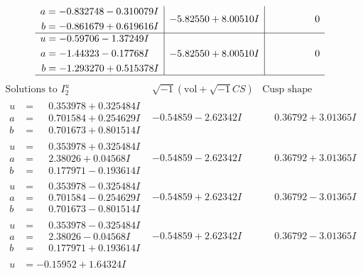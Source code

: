 \documentclass[1p]{elsarticle_modified}
\theoremstyle{definition}
\newcommand{\I}{\sqrt{-1}}
\begin{document}
$$\begin{array}{c|c|c}
\begin{aligned}
a &= -0.832748 - 0.310079 I \\
b &= -0.861679 + 0.619616 I\end{aligned}
 & -5.82550 + 8.00510 I & \phantom{-0.000000 } 0 \\ \hline\begin{aligned}
u &= -0.59706 - 1.37249 I \\
a &= -1.44323 - 0.17768 I \\
b &= -1.293270 + 0.515378 I\end{aligned}
 & -5.82550 + 8.00510 I & \phantom{-0.000000 } 0\\
 \hline 
 \end{array}$$\newpage$$\begin{array}{c|c|c}  
\text{Solutions to }I^u_{2}& \I (\text{vol} + \sqrt{-1}CS) & \text{Cusp shape}\\
 \hline 
\begin{aligned}
u &= \phantom{-}0.353978 + 0.325484 I \\
a &= \phantom{-}0.701584 + 0.254629 I \\
b &= \phantom{-}0.701673 + 0.801514 I\end{aligned}
 & -0.54859 - 2.62342 I & \phantom{-}0.36792 + 3.01365 I \\ \hline\begin{aligned}
u &= \phantom{-}0.353978 + 0.325484 I \\
a &= \phantom{-}2.38026 + 0.04568 I \\
b &= \phantom{-}0.177971 - 0.193614 I\end{aligned}
 & -0.54859 - 2.62342 I & \phantom{-}0.36792 + 3.01365 I \\ \hline\begin{aligned}
u &= \phantom{-}0.353978 - 0.325484 I \\
a &= \phantom{-}0.701584 - 0.254629 I \\
b &= \phantom{-}0.701673 - 0.801514 I\end{aligned}
 & -0.54859 + 2.62342 I & \phantom{-}0.36792 - 3.01365 I \\ \hline\begin{aligned}
u &= \phantom{-}0.353978 - 0.325484 I \\
a &= \phantom{-}2.38026 - 0.04568 I \\
b &= \phantom{-}0.177971 + 0.193614 I\end{aligned}
 & -0.54859 + 2.62342 I & \phantom{-}0.36792 - 3.01365 I \\ \hline\begin{aligned}
u &= -0.15952 + 1.64324 I \\

\end{aligned}
\end{array}$$
\end{document}

